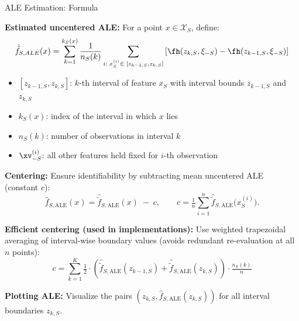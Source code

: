 \documentclass[11pt,compress,t,notes=noshow, aspectratio=169, xcolor=table]{beamer}
\begin{document}
\begin{frame}{ALE Estimation: Formula}

\textbf{Estimated uncentered ALE:}  
For a point $x \in \mathcal{X}_S$, define:
\[
\hat{\tilde{f}}_{S, ALE}(x) = \sum_{k = 1}^{k_S(x)}\frac{1}{n_S(k)}\sum_{i: \; x_S^{(i)} \in \; [z_{k-1, S}, z_{k, S}]}\left[\fh(z_{k, S}, \xi_{-S}) -\fh(z_{k-1, S}, \xi_{-S})\right]
\]

\begin{itemize}
\tightlist
  \item $[z_{k-1, S}, z_{k,S}]$: $k$-th interval of feature $x_S$ with interval bounds $z_{k-1, S}$ and $z_{k,S}$ 
  \item $k_S(x)$: index of the interval in which $x$ lies
  \item $n_S(k)$: number of observations in interval $k$
  \item $\xv_{-S}^{(i)}$: all other features held fixed for $i$-th observation
\end{itemize}

\pause
\medskip
\textbf{Centering:}  
Ensure identifiability by subtracting mean uncentered ALE (constant $c$):
\[
\hat f_{S,\text{ALE}}(x)=
\hat{\tilde f}_{S,\text{ALE}}(x)\;-\;c,
\qquad
c=\tfrac{1}{n}\textstyle\sum_{i=1}^{n}\hat{\tilde f}_{S,\text{ALE}}\bigl(x_S^{(i)}\bigr).
\]

\textbf{Efficient centering (used in implementations):}
Use weighted trapezoidal averaging of interval-wise boundary values (avoids redundant re-evaluation at all $n$ points):
\[
c =
\textstyle\sum_{k = 1}^{K} 
\tfrac{1
}{2} \cdot \left( 
\hat{\tilde{f}}_{S, \text{ALE}}(z_{k-1,S}) +
\hat{\tilde{f}}_{S, \text{ALE}}(z_{k,S}) \right) \cdot \tfrac{n_S(k)}{n} 
\]

\textbf{Plotting ALE:} Visualize the pairs $\left( z_{k,S}, \hat{f}_{S, \text{ALE}}(z_{k,S}) \right)$ for all interval boundaries $z_{k,S}$.
\end{frame}




\end{document}
